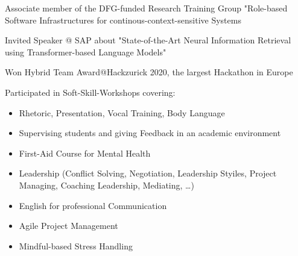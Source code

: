 \begin{cventries}
{\begin{cvitems}
			  \item{Associate member of the DFG-funded Research Training Group "Role-based Software Infrastructures for continous-context-sensitive Systems}
            \item{Invited Speaker @ SAP about "State-of-the-Art Neural Information Retrieval using Transformer-based Language Models"}
            \item{Won Hybrid Team Award@Hackzurick 2020, the largest Hackathon in Europe}
			\item{Participated in Soft-Skill-Workshops covering:
			            \begin{itemize}
                            \item Rhetoric, Presentation, Vocal Training, Body Language
                            \item Supervising students and giving Feedback in an academic environment
                            \item First-Aid Course for Mental Health
                            \item Leadership (Conflict Solving, Negotiation, Leadership Styiles, Project Managing, Coaching Leadership, Mediating, …)
                            \item English for professional Communication
                            \item Agile Project Management
                            \item Mindful-based Stress Handling
			            \end{itemize}
			      }         
		\end{cvitems}
	}



\end{cventries}
